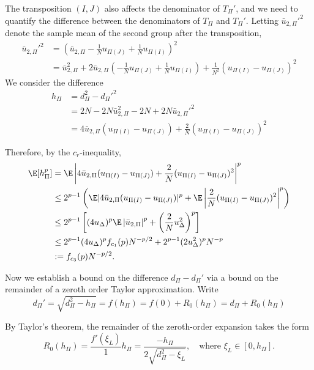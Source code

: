 The transposition $(I, J)$ also affects the denominator of $T_{\Pi}'$, and we need to quantify the
difference between the denominators of $T_{\Pi}$ and $T_{\Pi}'$.  Letting $\bar{u}_{2,\Pi}'^2$
denote the sample mean of the second group after the transposition,
\begin{align*}
  \bar{u}_{2,\Pi}'^2 &= \left ( \bar{u}_{2,\Pi}-\frac{1}{N}u_{\Pi(J)}+\frac{1}{N}u_{\Pi(I)} \right )^2 \\
  &= \bar{u}_{2,\Pi}^2 + 2 \bar{u}_{2,\Pi} \left ( -\frac{1}{N}u_{\Pi(J)} +
      \frac{1}{N}u_{\Pi(I)} \right ) + \frac{1}{N^2}(u_{\Pi(I)} - u_{\Pi(J)})^2
\end{align*}
We consider the difference
\begin{align*}
  h_{\Pi} &= d_{\Pi}^2 - d_{\Pi}'^2 \\
  &= 2N - 2N \bar{u}_{2,\Pi}^2 - 2N + 2N\bar{u}_{2,\Pi}'^2 \\
  &= 4\bar{u}_{2,\Pi}(u_{\Pi(I)} - u_{\Pi(J)}) + \frac{2}{N}(u_{\Pi(I)} - u_{\Pi(J)})^2
\end{align*}

Therefore, by the $c_r$-inequality,
\begin{align}
  \E[h_{\Pi}^p] &= \E \left | 4\bar{u}_{2,\Pi}(u_{\Pi(I)}-u_{\Pi(J)}) +
      \frac{2}{N}(u_{\Pi(I)}-u_{\Pi(J)})^2 \right |^p \nonumber \\
  &\leq 2^{p-1} \left ( \E |4\bar{u}_{2,\Pi}(u_{\Pi(I)}-u_{\Pi(J)})|^p
    + \E \left |\frac{2}{N}(u_{\Pi(I)}-u_{\Pi(J)})^2 \right |^p \right ) \nonumber \\
  &\leq 2^{p-1}\left [ (4u_{\Delta})^p \E \left | \bar{u}_{2,\Pi} \right |^p
    + \left ( \frac{2}{N}u_{\Delta}^2 \right )^p \right ] \nonumber \\
  &\leq 2^{p-1} (4u_{\Delta})^p f_{c_1}(p)N^{-p/2} +
  2^{p-1}(2u_{\Delta}^2)^pN^{-p} \nonumber \\
  &:= f_{c_3}(p)N^{-p/2} \label{def:hp}.
\end{align}

Now we establish a bound on the difference $d_{\Pi}-d_{\Pi}'$ via a
bound on the remainder of a zeroth order Taylor approximation.  Write
\begin{equation*}
  d_{\Pi}' = \sqrt{d_{\Pi}^2-h_{\Pi}} = f(h_{\Pi}) = f(0) + R_0(h_{\Pi}) = d_{\Pi} + R_0(h_{\Pi})
\end{equation*}

By Taylor's theorem, the remainder of the zeroth-order expansion takes the form
\begin{equation*}
  R_0(h_{\Pi}) = \frac{f'(\xi_L)}{1}h_{\Pi} = \frac{-h_{\Pi}}{2\sqrt{d_{\Pi}^2-\xi_L}}, \quad
  \text{where } \xi_L \in [0, h_{\Pi}].
\end{equation*}

